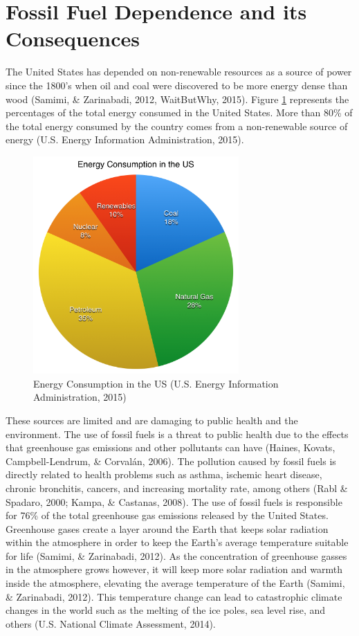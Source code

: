   \section {Fossil Fuel Dependence and its Consequences}
  \par The United States has depended on non-renewable resources as a source of power since the 1800's when oil and coal were discovered to be more energy dense than wood (Samimi, \& Zarinabadi, 2012, WaitButWhy, 2015). Figure \ref{fig:pie} represents the percentages of the total energy consumed in the United States. More than 80\% of the total energy consumed by the country comes from a non-renewable source of energy (U.S. Energy Information Administration, 2015).
  \begin{figure}[h]
    \centering
      \includegraphics[width=0.70\textwidth]{images/01-EnergyConsuptionPieChart}
    \caption{Energy Consumption in the US (U.S. Energy Information Administration, 2015)}
    \label{fig:pie}
  \end{figure}
  \par These sources are limited and are damaging to public health and the environment. The use of fossil fuels is a threat to public health due to the effects that greenhouse gas emissions and other pollutants can have (Haines, Kovats, Campbell-Lendrum, \& Corvalán, 2006).  The pollution caused by fossil fuels is directly related to health problems such as asthma, ischemic heart disease, chronic bronchitis, cancers, and increasing mortality rate, among others (Rabl \& Spadaro, 2000; Kampa, \& Castanas, 2008). The use of fossil fuels is responsible for 76\% of the total greenhouse gas emissions released by the United States. Greenhouse gases create a layer around the Earth that keeps solar radiation within the atmosphere in order to keep the Earth's average temperature suitable for life (Samimi, \& Zarinabadi, 2012).  As the concentration of greenhouse gasses in the atmosphere grows however, it will keep more solar radiation and warmth inside the atmosphere, elevating the average temperature of the Earth (Samimi, \& Zarinabadi, 2012). This temperature change can lead to catastrophic climate changes in the world such as the melting of the ice poles, sea level rise, and others (U.S. National Climate Assessment, 2014).
